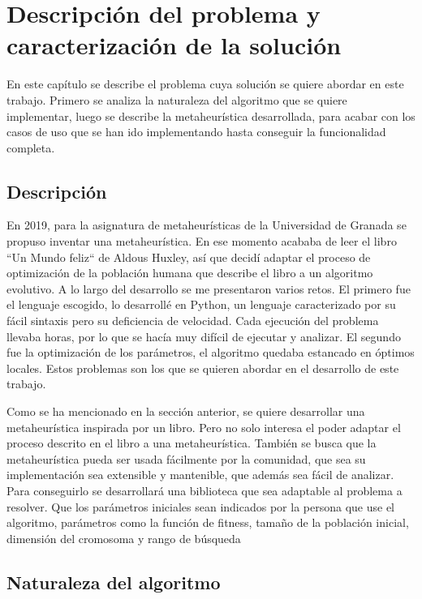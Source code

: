 \chapter{Descripción del problema y caracterización de la solución}

En este capítulo se describe el problema cuya solución se quiere abordar en este trabajo. Primero se analiza la naturaleza del algoritmo que
se quiere implementar, luego se describe la metaheurística desarrollada, para acabar con los casos de uso que se han ido 
implementando hasta conseguir la funcionalidad completa.

\section{Descripción}

En 2019, para la asignatura de metaheurísticas de la Universidad de Granada \cite{merelo_molina_2021} se propuso inventar una 
metaheurística. En ese momento acababa de leer el libro ``Un Mundo feliz`` de Aldous Huxley, así que decidí adaptar el proceso de 
optimización de la población humana que describe el libro a un algoritmo evolutivo. A lo largo del desarrollo se me presentaron varios retos.
El primero fue el lenguaje escogido, lo desarrollé en Python, un lenguaje caracterizado por su fácil sintaxis pero su deficiencia de
velocidad. Cada ejecución del problema llevaba horas, por lo que se hacía muy difícil de ejecutar y analizar. El
segundo fue la optimización de los parámetros, el algoritmo quedaba estancado en óptimos locales. Estos problemas son 
los que se quieren abordar en el desarrollo de este trabajo.

Como se ha mencionado en la sección anterior, se quiere desarrollar una metaheurística inspirada por un libro. Pero no solo interesa
el poder adaptar el proceso descrito en el libro a una metaheurística. También se busca que la metaheurística pueda ser
usada fácilmente por la comunidad, que sea su implementación sea extensible y mantenible, que además sea fácil de analizar. Para conseguirlo
se desarrollará una biblioteca que sea adaptable al problema a resolver. Que los parámetros iniciales sean 
indicados por la persona que use el algoritmo, parámetros como la función de fitness, tamaño de la población inicial,
dimensión del cromosoma y rango de búsqueda

\section{Naturaleza del algoritmo}


